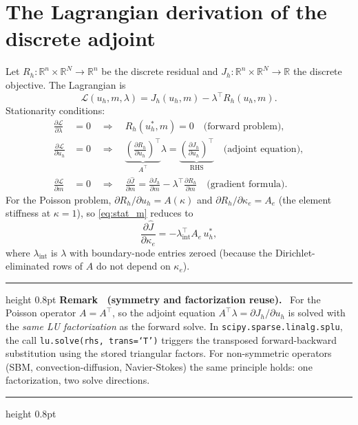 \documentclass[11pt]{article}
\newcounter{remark}
\newenvironment{remark}[1]{%
  \refstepcounter{remark}\par\medskip
  \noindent\begin{minipage}{\linewidth}
  \hrule height 0.8pt \smallskip
  \textbf{Remark \theremark\ (#1).}\ }{%
  \smallskip\hrule height 0.8pt \end{minipage}\par\medskip}
\newcommand{\RR}{\mathbb{R}}
\begin{document}
\section{The Lagrangian derivation of the discrete adjoint}
\label{sec:lagrangian}

Let $R_h : \RR^n \times \RR^N \to \RR^n$ be the discrete residual and
$J_h : \RR^n \times \RR^N \to \RR$ the discrete objective.
The Lagrangian is
\begin{equation}
  \mathcal{L}(u_h, m, \lambda) = J_h(u_h, m) - \lambda^\top R_h(u_h, m) .
\end{equation}
Stationarity conditions:
\begin{align}
  \frac{\partial \mathcal{L}}{\partial \lambda} &= 0
  \quad\Longrightarrow\quad R_h(u_h^*, m) = 0
  \quad\text{(forward problem)}, \label{eq:stat_lam}\\
  \frac{\partial \mathcal{L}}{\partial u_h} &= 0
  \quad\Longrightarrow\quad
  \underbrace{\left(\frac{\partial R_h}{\partial u_h}\right)^{\!\top}}_{A^\top}
  \lambda
  = \underbrace{\left(\frac{\partial J_h}{\partial u_h}\right)^{\!\top}}_{\text{RHS}}
  \quad\text{(adjoint equation)}, \label{eq:stat_u}\\
  \frac{\partial \mathcal{L}}{\partial m} &= 0
  \quad\Longrightarrow\quad
  \frac{\partial \hat{J}}{\partial m}
  = \frac{\partial J_h}{\partial m}
  - \lambda^\top \frac{\partial R_h}{\partial m}
  \quad\text{(gradient formula)}. \label{eq:stat_m}
\end{align}
For the Poisson problem, $\partial R_h/\partial u_h = A(\kappa)$ and
$\partial R_h/\partial \kappa_e = A_e$ (the element stiffness at
$\kappa = 1$), so \eqref{eq:stat_m} reduces to
\begin{equation}
  \frac{\partial \hat{J}}{\partial \kappa_e}
  = -\lambda_{\mathrm{int}}^\top A_e\, u_h^*,
  \label{eq:poissongrad}
\end{equation}
where $\lambda_{\mathrm{int}}$ is $\lambda$ with boundary-node
entries zeroed (because the Dirichlet-eliminated rows of $A$ do not
depend on $\kappa_e$).

\begin{remark}{symmetry and factorization reuse}
For the Poisson operator $A = A^\top$, so the adjoint equation
$A^\top \lambda = \partial J_h/\partial u_h$ is solved with the
\emph{same LU factorization} as the forward solve.  In
\texttt{scipy.sparse.linalg.splu}, the call
\texttt{lu.solve(rhs,~trans=`T')} triggers the transposed
forward-backward substitution using the stored triangular factors.
For non-symmetric operators (SBM, convection-diffusion, Navier-Stokes)
the same principle holds: one factorization, two solve directions.
\end{remark}
\end{document}
